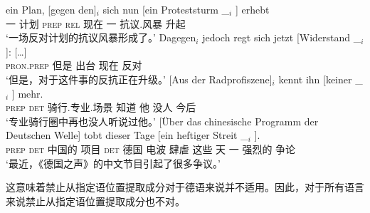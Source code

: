 \begin{sloppypar}
\ex 
\gll ein Plan, [gegen den]$_i$ sich nun [ein Proteststurm \_$_i$ ] erhebt\footnotemark\\
     一 计划 \spacebr{}\textsc{prep} \textsc{rel}  现在 \spacebr{}一 抗议.风暴 {} {} 升起\\
\glt `一场反对计划的抗议风暴形成了。'
\ex 
\gll {}Dagegen$_i$ jedoch regt sich jetzt [Widerstand \_$_i$ ]: [\ldots]\footnotemark\\
	{}\textsc{pron}.\textsc{prep} 但是 出台  现在 \spacebr{}反对 {}\\
\glt `但是，对于这件事的反抗正在升级。'
\ex
\gll {}[Aus der Radprofiszene]$_i$ kennt ihn [keiner \_$_i$ ] mehr.\footnotemark\\
	 {}\spacebr{}\textsc{prep} \textsc{det} 骑行.专业.场景 知道 他 \spacebr{}没人 {} {} 今后\\
\glt `专业骑行圈中再也没人听说过他。'
\ex 
\gll {}[Über das chinesische Programm der Deutschen Welle] tobt dieser Tage [ein heftiger Streit \_$_i$ ].\footnotemark\\
     \spacebr{}\textsc{prep} \textsc{det} 中国的 项目 \textsc{det} 德国 电波 肆虐 这些 天 \spacebr{}一 强烈的 争论\\
\glt `最近，《德国之声》的中文节目引起了很多争议。'
\zl
\end{sloppypar}

\noindent
这意味着禁止从指定语位置提取成分对于德语来说并不适用。因此，对于所有语言来说禁止从指定语位置提取成分也不对。


